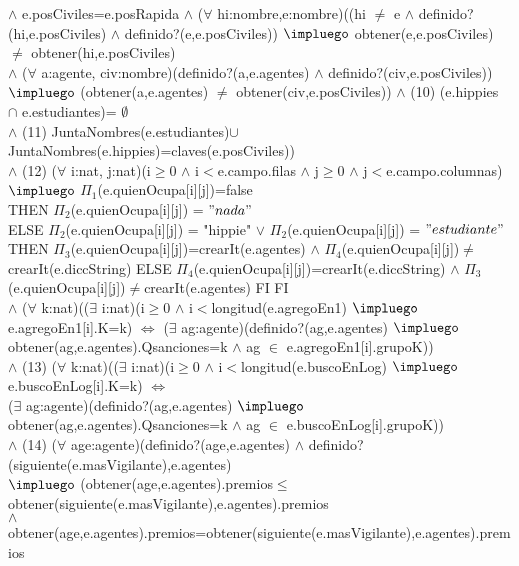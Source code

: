 { $\wedge$ e.posCiviles=e.posRapida $\wedge$ ($\forall$ hi:nombre,e:nombre)((hi $\neq$ e $\wedge$ definido?(hi,e.posCiviles) $\wedge$ definido?(e,e.posCiviles)) $\impluego$ obtener(e,e.posCiviles) $\neq$ obtener(hi,e.posCiviles) \\\hspace*{3em}$\wedge$ ($\forall$ a:agente, civ:nombre)(definido?(a,e.agentes) $\wedge$ definido?(civ,e.posCiviles)) \\\hspace*{3em} $\impluego$ (obtener(a,e.agentes) $\neq$ obtener(civ,e.posCiviles)) $\wedge$ (10) (e.hippies $\cap$ e.estudiantes)= $\emptyset$ \\\hspace*{3em} $\wedge$ (11) JuntaNombres(e.estudiantes)$\cup$JuntaNombres(e.hippies)=claves(e.posCiviles)) \\\hspace*{3em} $\wedge$ (12) ($\forall$ i:nat, j:nat)(i$\geq$0 $\wedge$ i$<$e.campo.filas $\wedge$ j$\geq$0 $\wedge$ j$<$e.campo.columnas) $\impluego$ \IF $\Pi_{1}$(e.quienOcupa[i][j])=false \\\hspace*{3em} THEN $\Pi_{2}$(e.quienOcupa[i][j]) = $"nada"$ \\\hspace*{3em} ELSE \IF $\Pi_{2}$(e.quienOcupa[i][j]) = "hippie" $\vee$ $\Pi_{2}$(e.quienOcupa[i][j]) = $"estudiante"$ THEN $\Pi_{3}$(e.quienOcupa[i][j])=crearIt(e.agentes) $\wedge$ $\Pi_{4}$(e.quienOcupa[i][j])$\neq$ crearIt(e.diccString) ELSE   $\Pi_{4}$(e.quienOcupa[i][j])=crearIt(e.diccString) $\wedge$ $\Pi_{3}$(e.quienOcupa[i][j])$\neq$crearIt(e.agentes) FI FI \\\hspace*{3em} $\wedge$ ($\forall$ k:nat)(($\exists$ i:nat)(i$\geq$0 $\wedge$ i$<$longitud(e.agregoEn1) $\impluego$ e.agregoEn1[i].K=k) $\Longleftrightarrow$ ($\exists$ ag:agente)(definido?(ag,e.agentes) $\impluego$ obtener(ag,e.agentes).Qsanciones=k $\wedge$ ag $\in$ e.agregoEn1[i].grupoK)) \\\hspace*{3em} $\wedge$ (13) ($\forall$ k:nat)(($\exists$ i:nat)(i$\geq$0 $\wedge$ i$<$longitud(e.buscoEnLog) $\impluego$ e.buscoEnLog[i].K=k) $\Longleftrightarrow$ \\\hspace*{3em} ($\exists$ ag:agente)(definido?(ag,e.agentes) $\impluego$ obtener(ag,e.agentes).Qsanciones=k $\wedge$ ag $\in$ e.buscoEnLog[i].grupoK)) \\\hspace*{3em} $\wedge$ (14) ($\forall$ age:agente)(definido?(age,e.agentes) $\wedge$ definido?(siguiente(e.masVigilante),e.agentes) \\\hspace*{3em} $\impluego$ (obtener(age,e.agentes).premios$\leq$ obtener(siguiente(e.masVigilante),e.agentes).premios \\\hspace*{3em} $\wedge$ obtener(age,e.agentes).premios=obtener(siguiente(e.masVigilante),e.agentes).premios \\\hspace*{3em} }
